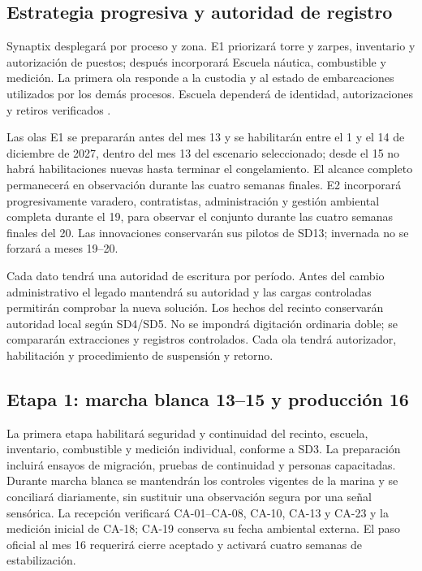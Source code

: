 \subsection{Estrategia progresiva y autoridad de registro} %
Synaptix desplegará por proceso y zona. E1 priorizará torre y zarpes, inventario y autorización de puestos; después incorporará Escuela náutica, combustible y medición. La primera ola responde a la custodia y al estado de embarcaciones utilizados por los demás procesos. Escuela dependerá de identidad, autorizaciones y retiros verificados \parencite[cap.~17, secc.~17.6, p.~43]{caso07}.

Las olas E1 se prepararán antes del mes 13 y se habilitarán entre el 1 y el 14 de diciembre de 2027, dentro del mes 13 del escenario seleccionado; desde el 15 no habrá habilitaciones nuevas hasta terminar el congelamiento. El alcance completo permanecerá en observación durante las cuatro semanas finales. E2 incorporará progresivamente varadero, contratistas, administración y gestión ambiental completa durante el 19, para observar el conjunto durante las cuatro semanas finales del 20. Las innovaciones conservarán sus pilotos de SD13; invernada no se forzará a meses 19--20.

Cada dato tendrá una autoridad de escritura por período. Antes del cambio administrativo el legado mantendrá su autoridad y las cargas controladas permitirán comprobar la nueva solución. Los hechos del recinto conservarán autoridad local según SD4/SD5. No se impondrá digitación ordinaria doble; se compararán extracciones y registros controlados. Cada ola tendrá autorizador, habilitación y procedimiento de suspensión y retorno.




\subsection{Etapa 1: marcha blanca 13--15 y producción 16} %
La primera etapa habilitará seguridad y continuidad del recinto, escuela, inventario, combustible y medición individual, conforme a SD3. La preparación incluirá ensayos de migración, pruebas de continuidad y personas capacitadas. Durante marcha blanca se mantendrán los controles vigentes de la marina y se conciliará diariamente, sin sustituir una observación segura por una señal sensórica. La recepción verificará CA-01--CA-08, CA-10, CA-13 y CA-23 y la medición inicial de CA-18; CA-19 conserva su fecha ambiental externa. El paso oficial al mes 16 requerirá cierre aceptado y activará cuatro semanas de estabilización.




